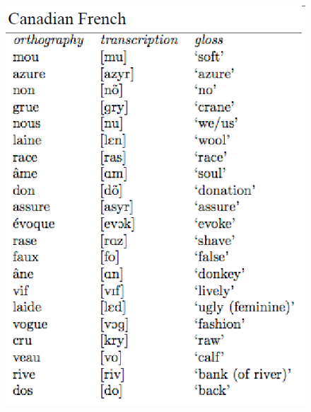\documentclass[12pt]{article}
\begin{document}
\begin{figure}[H]
\includegraphics{../images/canadianfrench.png}
\end{figure}

\newpage

\begin{center}
\textbf{{\color{red}{\HUGE END OF EXAM}}}\\

\end{center}
\newpage

\begin{center}
\textbf{{\color{blue}{\HUGE START OF EXAM\\}}}

\textbf{{\color{blue}{\HUGE Student ID: 2931\\}}}

\textbf{{\color{blue}{\HUGE 2:45 - 3:00 PM\\}}}

\end{center}
\newpage
\end{document}
